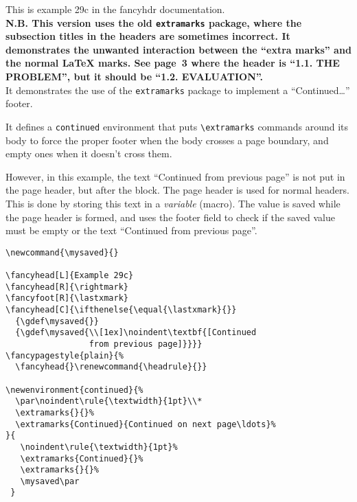 \documentclass{report}
\newcommand{\mysaved}{}
\begin{document}
\tableofcontents

\thispagestyle{plain}
\noindent
\begin{boxedminipage}{\textwidth}
This is example 29c in the fancyhdr documentation.
\\[1ex]
\textbf{N.B. This version uses the old \texttt{extramarks} package, where the subsection titles in the headers are sometimes incorrect. It demonstrates the unwanted interaction between the ``extra marks'' and the normal \LaTeX{} marks. See page~3 where the header is ``1.1. THE PROBLEM'', but it should be ``1.2. EVALUATION''.}
\\[1ex]
It demonstrates the use of the \texttt{extramarks} package to implement
a ``Continued\ldots'' footer.

It defines a \texttt{continued} environment that puts \verb|\extramarks| commands around its body to force the proper footer when the body crosses a page boundary, and empty ones when it doesn't cross them.

However, in this example, the text ``Continued from previous page'' is not put in the page header, but after the block. The page header is used for normal headers. This is done by storing this text in a \emph{variable} (macro). The value is saved while the page header is formed, and uses the footer field to check if the saved value must be empty or the text ``Continued from previous page''.

\begin{verbatim}
\newcommand{\mysaved}{}

\fancyhead[L]{Example 29c}
\fancyhead[R]{\rightmark}
\fancyfoot[R]{\lastxmark}
\fancyhead[C]{\ifthenelse{\equal{\lastxmark}{}}
  {\gdef\mysaved{}}
  {\gdef\mysaved{\\[1ex]\noindent\textbf{[Continued
                 from previous page]}}}}
\fancypagestyle{plain}{%
  \fancyhead{}\renewcommand{\headrule}{}}

\newenvironment{continued}{%
  \par\noindent\rule{\textwidth}{1pt}\\*
  \extramarks{}{}%
  \extramarks{Continued}{Continued on next page\ldots}%
}{
   \noindent\rule{\textwidth}{1pt}%
   \extramarks{Continued}{}%
   \extramarks{}{}%
   \mysaved\par
 }
\end{verbatim}

\end{boxedminipage}

\pagestyle{fancy}
\end{document}
